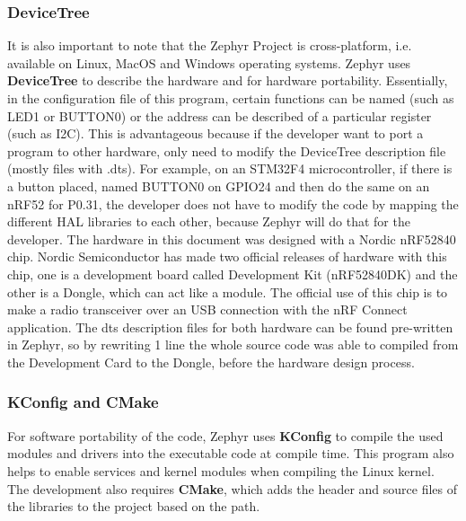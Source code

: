 \subsubsection{DeviceTree}
It is also important to note that the Zephyr Project is cross-platform, i.e. available on Linux, MacOS and Windows operating systems. Zephyr uses \textbf{DeviceTree} to describe the hardware and for hardware portability. Essentially, in the configuration file of this program, certain functions can be named (such as LED1 or BUTTON0) or the address can be described of a particular register (such as I2C). This is advantageous because if the developer want to port a program to other hardware, only need to modify the DeviceTree description file (mostly files with .dts). For example, on an STM32F4 microcontroller, if there is a button placed, named BUTTON0 on GPIO24 and then do the same on an nRF52 for P0.31, the developer does not have to modify the code by mapping the different HAL libraries to each other, because Zephyr will do that for the developer. The hardware in this document was designed with a Nordic nRF52840 chip. Nordic Semiconductor has made two official releases of hardware with this chip, one is a development board called Development Kit (nRF52840DK) and the other is a Dongle, which can act like a module. The official use of this chip is to make a radio transceiver over an USB connection with the nRF Connect application. The dts description files for both hardware can be found pre-written in Zephyr, so by rewriting 1 line the whole source code was able to compiled from the Development Card to the Dongle, before the hardware design process.

\subsubsection{KConfig and CMake}
For software portability of the code, Zephyr uses \textbf{KConfig} to compile the used modules and drivers into the executable code at compile time. This program also helps to enable services and kernel modules when compiling the Linux kernel. The development also requires \textbf{CMake}, which adds the header and source files of the libraries to the project based on the path.

